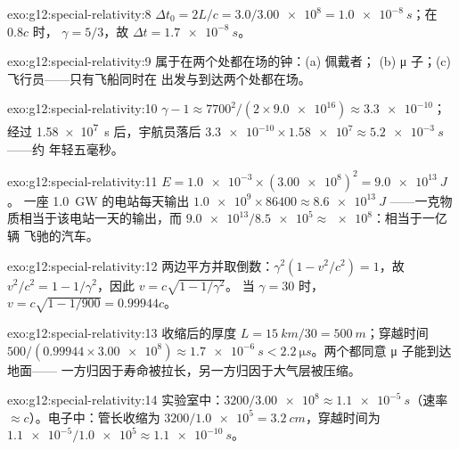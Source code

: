 \begin{solution}{exo:g12:special-relativity:8}
$\Delta t_0 = 2L/c = 3.0/\num{3.00e8} = \qty{1.0e-8}{s}$；在 $0.8c$ 时，
$\gamma = 5/3$，故 $\Delta t = \qty{1.7e-8}{s}$。
\end{solution}

\begin{solution}{exo:g12:special-relativity:9}
属于在两个处都在场的钟：(a) 佩戴者；
(b) μ 子；(c) 飞行员——只有飞船同时在
出发与到达两个处都在场。
\end{solution}

\begin{solution}{exo:g12:special-relativity:10}
$\gamma - 1 \approx 7700^2/(2 \times \num{9.0e16}) \approx
\num{3.3e-10}$；经过 \qty{1.58e7}{s} 后，宇航员落后
$\num{3.3e-10} \times \num{1.58e7} \approx \qty{5.2e-3}{s}$ ——约
年轻五毫秒。
\end{solution}

\begin{solution}{exo:g12:special-relativity:11}
$E = \num{1.0e-3} \times (\num{3.00e8})^2 = \qty{9.0e13}{J}$。
一座 \qty{1.0}{GW} 的电站每天输出 $\num{1.0e9} \times 86400 \approx
\qty{8.6e13}{J}$ ——一克物质相当于该电站一天的输出，而
$\num{9.0e13}/\num{8.5e5} \approx \num{e8}$：相当于一亿辆
飞驰的汽车。
\end{solution}

\begin{solution}{exo:g12:special-relativity:12}
两边平方并取倒数：$\gamma^2(1 - v^2/c^2) = 1$，故
$v^2/c^2 = 1 - 1/\gamma^2$，因此 $v = c\sqrt{1 - 1/\gamma^2}$。
当 $\gamma = 30$ 时，$v = c\sqrt{1 - 1/900} = 0.99944c$。
\end{solution}

\begin{solution}{exo:g12:special-relativity:13}
收缩后的厚度 $L = \qty{15}{km}/30 = \qty{500}{m}$；穿越时间
$500/(0.99944 \times \num{3.00e8}) \approx \qty{1.7e-6}{s} <
\qty{2.2}{\micro s}$。两个都同意 μ 子能到达地面——
一方归因于寿命被拉长，另一方归因于大气层被压缩。
\end{solution}

\begin{solution}{exo:g12:special-relativity:14}
实验室中：$3200/\num{3.00e8} \approx \qty{1.1e-5}{s}$（速率
$\approx c$）。电子中：管长收缩为
$3200/\num{1.0e5} = \qty{3.2}{cm}$，穿越时间为
$\num{1.1e-5}/\num{1.0e5} \approx \qty{1.1e-10}{s}$。
\end{solution}

